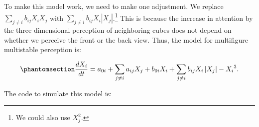 \documentclass[
  a4paper,
  DIV=11,
  numbers=noendperiod,
  oneside]{scrreprt}
\begin{document}
To make this model work, we need to make one adjustment. We replace
\(\sum_{j \neq i}^{}{b_{ij}X_{i}X_{j}}\) with
\(\sum_{j \neq i}^{}{b_{ij}X_{i}|X_{j}|}\).\footnote{We could also use
  \(X_j^2\).} This is because the increase in attention by the
three-dimensional perception of neighboring cubes does not depend on
whether we perceive the front or the back view. Thus, the model for
multifigure multistable perception is:

\begin{equation}\phantomsection\label{eq-ch4n-21-old-41}{
\frac{dX_{i}}{dt} = a_{0i} + \sum_{j \neq i}^{}{a_{ij}X_{j}} + b_{0i}X_{i} + \sum_{j \neq i}^{}{b_{ij}X_{i}\left| X_{j} \right|} - {X_{i}}^{3}.
}\end{equation}

The code to simulate this model is:
\end{document}
